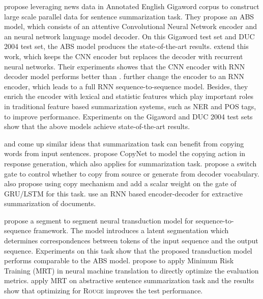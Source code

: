 \documentclass[11pt,a4paper]{article}
\begin{document}
\citet{rush-chopra-weston:2015:EMNLP} propose leveraging news data in Annotated English Gigaword \citep{Napoles:2012:AG:2391200.2391218} corpus to construct large scale parallel data for sentence summarization task.
They propose an ABS model, which consists of an attentive Convolutional Neural Network encoder and an neural network language model \citep{bengio2003neural} decoder.
On this Gigaword test set and DUC 2004 test set, the ABS model produces the state-of-the-art results.
\citet{chopra-auli-rush:2016:N16-1} extend this work, which keeps the CNN encoder but replaces the decoder with recurrent neural networks.
Their experiments showes that the CNN encoder with RNN decoder model performs better than \citet{rush-chopra-weston:2015:EMNLP}.
\citet{nallapatiabstractive} further change the encoder to an RNN encoder, which leads to a full RNN sequence-to-sequence model.
Besides, they enrich the encoder with lexical and statistic features which play important roles in traditional feature based summarization systems, such as NER and POS tags, to improve performance.
Experiments on the Gigaword and DUC 2004 test sets show that the above models achieve state-of-the-art results.

\citet{gu-EtAl:2016:P16-1} and \citet{gulcehre-EtAl:2016:P16-1} come up similar ideas that summarization task can benefit from copying words from input sentences.
\citet{gu-EtAl:2016:P16-1} propose CopyNet to model the copying action in response generation, which also applies for summarization task.
\citet{gulcehre-EtAl:2016:P16-1} propose a switch gate to control whether to copy from source or generate from decoder vocabulary.
\citet{zeng2016efficient} also propose using copy mechanism and add a scalar weight on the gate of GRU/LSTM for this task.
\citet{cheng-lapata:2016:P16-1} use an RNN based encoder-decoder for extractive summarization of documents.

\citet{yu-buys-blunsom:2016:EMNLP2016} propose a segment to segment neural transduction model for sequence-to-sequence framework.
The model introduces a latent segmentation which determines correspondences between tokens of the input sequence and the output sequence.
Experiments on this task show that the proposed transduction model performs comparable to the ABS model.
\citet{shen-EtAl:2016:P16-1} propose to apply Minimum Risk Training (MRT) in neural machine translation to directly optimize the evaluation metrics.
\citet{DBLP:journals/corr/AyanaSLS16} apply MRT on abstractive sentence summarization task and the results show that optimizing for \textsc{Rouge} improves the test performance.
 
\end{document}

